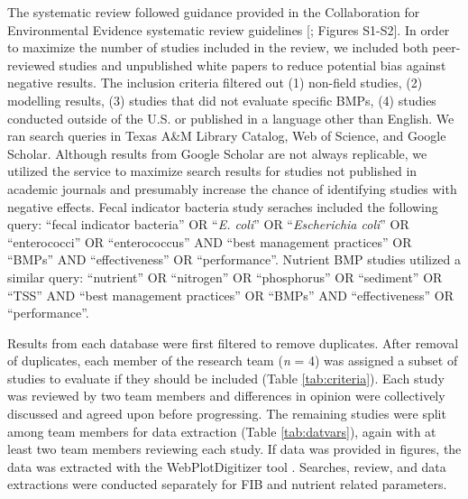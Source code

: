 \documentclass[utf8]{FrontiersinHarvard}
\begin{document}
The systematic review followed guidance provided in the Collaboration for Environmental Evidence systematic review guidelines {[}\citet{collaborationforenvironmentalevidenceGuidelinesStandardsEvidence2018}; Figures S1-S2{]}.
In order to maximize the number of studies included in the review, we included both peer-reviewed studies and unpublished white papers to reduce potential bias against negative results.
The inclusion criteria filtered out (1) non-field studies, (2) modelling results, (3) studies that did not evaluate specific BMPs, (4) studies conducted outside of the U.S. or published in a language other than English.
We ran search queries in Texas A\&M Library Catalog, Web of Science, and Google Scholar.
Although results from Google Scholar are not always replicable, we utilized the service to maximize search results for studies not published in academic journals and presumably increase the chance of identifying studies with negative effects.
Fecal indicator bacteria study seraches included the following query: ``fecal indicator bacteria'' OR ``\emph{E. coli}'' OR ``\emph{Escherichia coli}'' OR ``enterococci'' OR ``enterococcus'' AND ``best management practices'' OR ``BMPs'' AND ``effectiveness'' OR ``performance''. Nutrient BMP studies utilized a similar query: ``nutrient'' OR ``nitrogen'' OR ``phosphorus'' OR ``sediment'' OR ``TSS'' AND ``best management practices'' OR ``BMPs'' AND ``effectiveness'' OR ``performance''.

Results from each database were first filtered to remove duplicates.
After removal of duplicates, each member of the research team (\emph{n} = 4) was assigned a subset of studies to evaluate if they should be included (Table \ref{tab:criteria}).
Each study was reviewed by two team members and differences in opinion were collectively discussed and agreed upon before progressing.
The remaining studies were split among team members for data extraction (Table \ref{tab:datvars}), again with at least two team members reviewing each study.
If data was provided in figures, the data was extracted with the WebPlotDigitizer tool \citep{rohatgiWebPlotDigitizer2022}.
Searches, review, and data extractions were conducted separately for FIB and nutrient related parameters.
\end{document}
